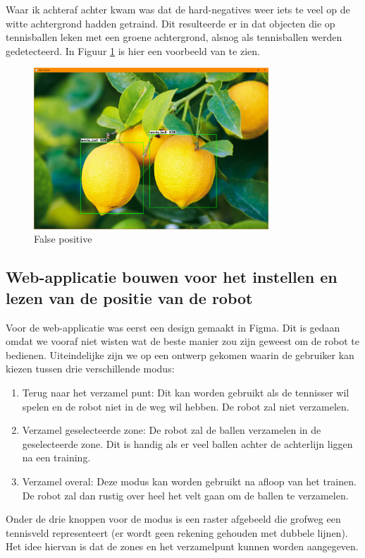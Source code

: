 Waar ik achteraf achter kwam  was dat de hard-negatives weer iets te veel op de witte achtergrond hadden getraind. Dit resulteerde er in dat objecten die op tennisballen leken met een groene achtergrond, alsnog als tennisballen werden gedetecteerd. In Figuur \ref{fig:false-positive} is hier een voorbeeld van te zien.

\begin{figure}[H]
    \centering
    \includegraphics[width=250pt]{img/hard_negative_background.png}
    \caption{False positive}
    \label{fig:false-positive}
\end{figure}

\subsection{Web-applicatie bouwen voor het instellen en lezen van de positie van de robot}
Voor de web-applicatie was eerst een design gemaakt in Figma. Dit is gedaan omdat we vooraf niet wisten wat de beste manier zou zijn geweest om de robot te bedienen. Uiteindelijke zijn we op een ontwerp gekomen waarin de gebruiker kan kiezen tussen drie verschillende modus:\\
\begin{enumerate}
    \item Terug naar het verzamel punt: Dit kan worden gebruikt als de tennisser wil spelen en de robot niet in de weg wil hebben. De robot zal niet verzamelen.
    \item Verzamel geselecteerde zone: De robot zal de ballen verzamelen in de geselecteerde zone. Dit is handig als er veel ballen achter de achterlijn liggen na een training.
    \item Verzamel overal: Deze modus kan worden gebruikt na afloop van het trainen. De robot zal dan rustig over heel het velt gaan om de ballen te verzamelen.
\end{enumerate}

Onder de drie knoppen voor de modus is een raster afgebeeld die grofweg een tennisveld representeert (er wordt geen rekening gehouden met dubbele lijnen). Het idee hiervan is dat de zones en het verzamelpunt kunnen worden aangegeven.\\


